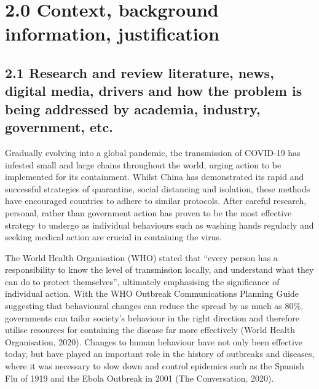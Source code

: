 \documentclass[11pt]{article}
\begin{document}
    \hypertarget{context-background-information-justification}{%
\section{2.0 Context, background information,
justification}\label{context-background-information-justification}}

    \hypertarget{research-and-review-literature-news-digital-media-drivers-and-how-the-problem-is-being-addressed-by-academia-industry-government-etc.}{%
\subsection{2.1 Research and review literature, news, digital media,
drivers and how the problem is being addressed by academia, industry,
government,
etc.}\label{research-and-review-literature-news-digital-media-drivers-and-how-the-problem-is-being-addressed-by-academia-industry-government-etc.}}

    Gradually evolving into a global pandemic, the transmission of COVID-19
has infested small and large chains throughout the world, urging action
to be implemented for its containment. Whilst China has demonstrated its
rapid and successful strategies of quarantine, social distancing and
isolation, these methods have encouraged countries to adhere to similar
protocols. After careful research, personal, rather than government
action has proven to be the most effective strategy to undergo as
individual behaviours such as washing hands regularly and seeking
medical action are crucial in containing the virus.

    The World Health Organisation (WHO) stated that ``every person has a
responsibility to know the level of transmission locally, and understand
what they can do to protect themselves'', ultimately emphasising the
significance of individual action. With the WHO Outbreak Communications
Planning Guide suggesting that behavioural changes can reduce the spread
by as much as 80\%, governments can tailor society's behaviour in the
right direction and therefore utilise resources for containing the
disease far more effectively (World Health Organisation, 2020). Changes
to human behaviour have not only been effective today, but have played
an important role in the history of outbreaks and diseases, where it was
necessary to slow down and control epidemics such as the Spanish Flu of
1919 and the Ebola Outbreak in 2001 (The Conversation, 2020).
\end{document}
